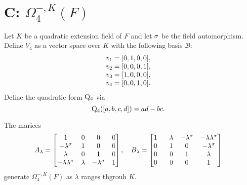 \chapter{C: $\Omega_4^{-,K}(F)$}
\label{AppC}

Let $K$ be a quadratic extension field of $F$ and let $\sigma$ be the field
automorphism. Define $V_4$ as a vector space over $K$ with the following 
basis $\mathcal{B}$:
\begin{equation}
	\begin{array}{r@{\;}c@{\;}l}
		v_1 & = & [0,1,0,0], \\
		v_2 & = & [0,0,0,1], \\
		v_3 & = & [1,0,0,0], \\
		v_4 & = & [0,0,1,0].
	\end{array}
\end{equation}
Define the quadratic 
form $\mathord{\mathrm{Q}}_4$ via
\begin{equation}
	\mathord{\mathrm{Q}}_4([a, b, c, d]) = ad - bc.
\end{equation} 

\begin{lemma}
	\label{lemma:C_omega4minus}
	The marices
	\begin{equation*}
		A_{\lambda}	= \begin{bmatrix}
			1 & 0 & 0 & 0 \\
			-\lambda^{\sigma} & 1 & 0 & 0 \\
			\lambda & 0 & 1 & 0 \\
			-\lambda\lambda^{\sigma} & \lambda & -\lambda^{\sigma} & 1
		\end{bmatrix},\quad 
		B_{\lambda} = \begin{bmatrix}
			1 & \phantom{-}\lambda & -\lambda^{\sigma} & -\lambda\lambda^{\sigma} \\
			0 & \phantom{-}1 & 0 & -\lambda^{\sigma} \\
			0 & \phantom{-}0 & 1 & \lambda \\
			0 & \phantom{-}0 & 0 & 1
		\end{bmatrix}
	\end{equation*}
	generate $\Omega_4^{-,K}(F)$ as $\lambda$ ranges thgrouh $K$.
\end{lemma}

